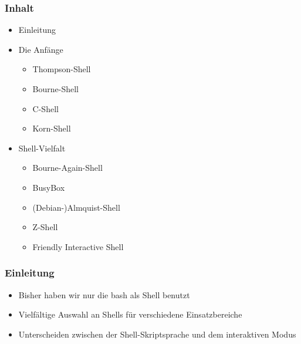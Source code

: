\begin{frame}
    \titlepage
\end{frame}

\begin{frame}
    \frametitle{Inhalt}
    \begin{itemize}
        \item Einleitung
        \item Die Anfänge
        \begin{itemize}
            \item Thompson-Shell
            \item Bourne-Shell
            \item C-Shell
            \item Korn-Shell
        \end{itemize}
        \pause
        \item Shell-Vielfalt
        \begin{itemize}
            \item Bourne-Again-Shell
            \item BusyBox
            \item (Debian-)Almquist-Shell
            \item Z-Shell
            \item Friendly Interactive Shell
        \end{itemize}
    \end{itemize}
\end{frame}

\begin{frame}
    \frametitle{Einleitung}
    \begin{itemize}
        \item Bisher haben wir nur die bash als Shell benutzt
        \item Vielfältige Auswahl an Shells für verschiedene Einsatzbereiche
        \item Unterscheiden zwischen der Shell-Skriptsprache und dem interaktiven Modus
    \end{itemize}
\end{frame}
